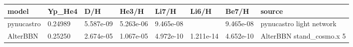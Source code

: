 \begin{tabular}{llllllll}
\toprule
model & Yp_He4 & D/H & He3/H & Li7/H & Li6/H & Be7/H & source \\
\midrule
pynucastro & 0.24989 & 5.587e-09 & 5.263e-06 & 9.465e-08 &  & 9.465e-08 & pynucastro light network \\
AlterBBN & 0.25250 & 2.674e-05 & 1.067e-05 & 4.972e-10 & 1.211e-14 & 4.652e-10 & AlterBBN stand_cosmo.x 5 \\
\bottomrule
\end{tabular}
